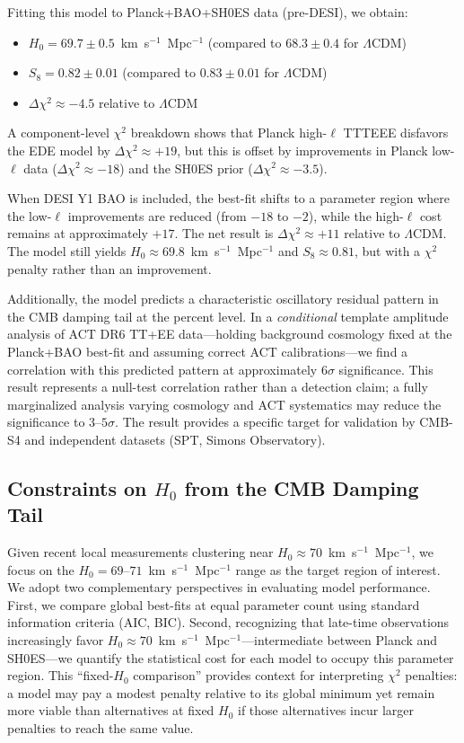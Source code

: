 \documentclass[a4paper,11pt]{article}
\begin{document}
Fitting this model to Planck+BAO+SH0ES data (pre-DESI), we obtain:
\begin{itemize}
    \item $H_0 = 69.7 \pm 0.5$~km~s$^{-1}$~Mpc$^{-1}$ (compared to $68.3 \pm 0.4$ for $\Lambda$CDM)
    \item $S_8 = 0.82 \pm 0.01$ (compared to $0.83 \pm 0.01$ for $\Lambda$CDM)
    \item $\Delta\chi^2 \approx -4.5$ relative to $\Lambda$CDM
\end{itemize}
A component-level $\chi^2$ breakdown shows that Planck high-$\ell$ TTTEEE disfavors the EDE model by $\Delta\chi^2 \approx +19$, but this is offset by improvements in Planck low-$\ell$ data ($\Delta\chi^2 \approx -18$) and the SH0ES prior ($\Delta\chi^2 \approx -3.5$).

When DESI Y1 BAO is included, the best-fit shifts to a parameter region where the low-$\ell$ improvements are reduced (from $-18$ to $-2$), while the high-$\ell$ cost remains at approximately $+17$. The net result is $\Delta\chi^2 \approx +11$ relative to $\Lambda$CDM. The model still yields $H_0 \approx 69.8$~km~s$^{-1}$~Mpc$^{-1}$ and $S_8 \approx 0.81$, but with a $\chi^2$ penalty rather than an improvement.

Additionally, the model predicts a characteristic oscillatory residual pattern in the CMB damping tail at the percent level. In a \emph{conditional} template amplitude analysis of ACT DR6 TT+EE data---holding background cosmology fixed at the Planck+BAO best-fit and assuming correct ACT calibrations---we find a correlation with this predicted pattern at approximately $6\sigma$ significance. This result represents a null-test correlation rather than a detection claim; a fully marginalized analysis varying cosmology and ACT systematics may reduce the significance to $3$--$5\sigma$. The result provides a specific target for validation by CMB-S4 and independent datasets (SPT, Simons Observatory).

\subsection{Constraints on $H_0$ from the CMB Damping Tail}
\label{sec:h0_constraints}

Given recent local measurements clustering near $H_0 \approx 70$~km~s$^{-1}$~Mpc$^{-1}$, we focus on the $H_0 = 69$--$71$~km~s$^{-1}$~Mpc$^{-1}$ range as the target region of interest. We adopt two complementary perspectives in evaluating model performance. First, we compare global best-fits at equal parameter count using standard information criteria (AIC, BIC). Second, recognizing that late-time observations increasingly favor $H_0 \approx 70$~km~s$^{-1}$~Mpc$^{-1}$---intermediate between Planck and SH0ES---we quantify the statistical cost for each model to occupy this parameter region. This ``fixed-$H_0$ comparison'' provides context for interpreting $\chi^2$ penalties: a model may pay a modest penalty relative to its global minimum yet remain more viable than alternatives at fixed $H_0$ if those alternatives incur larger penalties to reach the same value.
\end{document}
